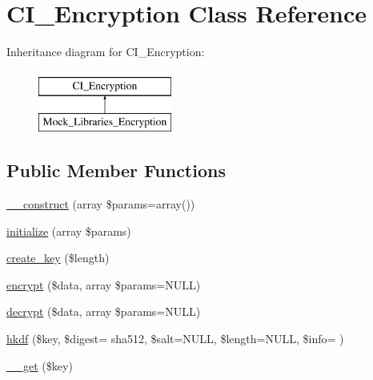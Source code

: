 \hypertarget{class_c_i___encryption}{}\section{C\+I\+\_\+\+Encryption Class Reference}
\label{class_c_i___encryption}
Inheritance diagram for C\+I\+\_\+\+Encryption\+:\begin{figure}[H]
\begin{center}
\leavevmode
\includegraphics[height=2.000000cm]{class_c_i___encryption}
\end{center}
\end{figure}
\subsection*{Public Member Functions}
\begin{DoxyCompactItemize}
\item 
\hyperlink{class_c_i___encryption_a85ac5b7f54ad67ec6b5b9dc282717602}{\+\_\+\+\_\+construct} (array \$params=array())
\item 
\hyperlink{class_c_i___encryption_ada6f73e99259423863fe312baa4dad10}{initialize} (array \$params)
\item 
\hyperlink{class_c_i___encryption_a153c5db947db0e572680ed82519cf27e}{create\+\_\+key} (\$length)
\item 
\hyperlink{class_c_i___encryption_a4b260dc7f6a9470e3e95ceeceadb2c86}{encrypt} (\$data, array \$params=N\+U\+L\+L)
\item 
\hyperlink{class_c_i___encryption_a5f379806ec38a79a6be1dc350b07699a}{decrypt} (\$data, array \$params=N\+U\+L\+L)
\item 
\hyperlink{class_c_i___encryption_a84a205a2c424d1bb2c887b63bed48c25}{hkdf} (\$key, \$digest= \textquotesingle{}sha512\textquotesingle{}, \$salt=N\+U\+L\+L, \$length=N\+U\+L\+L, \$info= \textquotesingle{}\textquotesingle{})
\item 
\hyperlink{class_c_i___encryption_a4537dad3b44254124991341cc91b28fb}{\+\_\+\+\_\+get} (\$key)
\end{DoxyCompactItemize}
